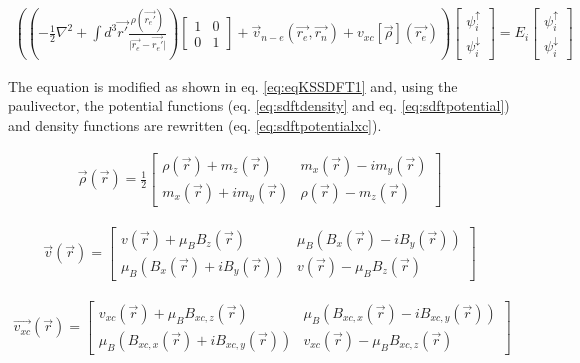 \begin{equation}
\begin{split}
\left(\left(-\frac{1}{2} \nabla^2  + \int d^3\vec{r'} \frac{\rho(\vec{r_{e}'})}{\lvert \vec{r_{e}} - \vec{r_{e}'} \rvert} \right) \begin{bmatrix} 1 & 0 \\ 0 & 1 \end{bmatrix} + \vec{v}_{n-e}(\vec{r_e}, \vec{r_n}) + v_{xc}[\vec{\rho}](\vec{r_{e}}) \right) \begin{bmatrix} \psi^{\uparrow}_{i} \\ \psi^{\downarrow}_{i} \end{bmatrix} = E_i \begin{bmatrix} \psi^{\uparrow}_{i} \\ \psi^{\downarrow}_{i} \end{bmatrix} 
\label{eq:eqKSSDFT1}
\end{split}
\end{equation}

The equation is modified as shown in eq. \ref{eq:eqKSSDFT1} and, using the \gls{paulivector}, the potential functions (eq. \ref{eq:sdftdensity} and eq. \ref{eq:sdftpotential})\cite{spindft4} and density functions are rewritten (eq. \ref{eq:sdftpotentialxc})\cite{spindft4}.

\begin{equation}
\begin{split}
\vec{\rho}(\vec{r}) = \frac{1}{2} \begin{bmatrix} \rho(\vec{r}) + m_z(\vec{r}) & m_x(\vec{r}) - i m_y(\vec{r}) \\ m_x(\vec{r}) + i m_y(\vec{r}) & \rho(\vec{r}) - m_z(\vec{r}) \end{bmatrix}
\label{eq:sdftdensity}
\end{split}
\end{equation}

\begin{equation}
\begin{split}
\vec{v}(\vec{r}) = \begin{bmatrix} v(\vec{r}) + \mu_B B_z(\vec{r}) & \mu_B (B_x(\vec{r}) - i B_y(\vec{r})) \\ \mu_B (B_x(\vec{r}) + i B_y(\vec{r})) & v(\vec{r}) - \mu_B B_z(\vec{r}) \end{bmatrix}
\label{eq:sdftpotential}
\end{split}
\end{equation}

\begin{equation}
\begin{split}
\vec{v_{xc}}(\vec{r}) = \begin{bmatrix} v_{xc}(\vec{r}) + \mu_B B_{xc, z}(\vec{r}) & \mu_B (B_{xc, x}(\vec{r}) - i B_{xc, y}(\vec{r})) \\ \mu_B (B_{xc, x}(\vec{r}) + i B_{xc, y}(\vec{r})) & v_{xc}(\vec{r}) - \mu_B B_{xc, z}(\vec{r}) \end{bmatrix}
\label{eq:sdftpotentialxc}
\end{split}
\end{equation}

